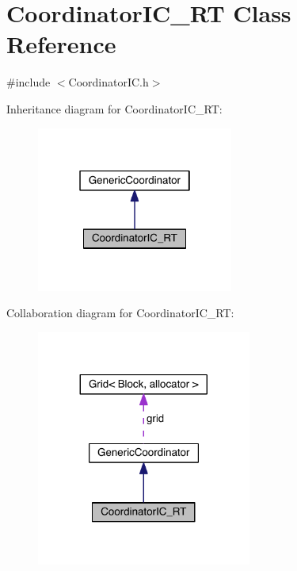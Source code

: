 \hypertarget{class_coordinator_i_c___r_t}{}\section{Coordinator\+I\+C\+\_\+\+R\+T Class Reference}
\label{class_coordinator_i_c___r_t}


{\ttfamily \#include $<$Coordinator\+I\+C.\+h$>$}



Inheritance diagram for Coordinator\+I\+C\+\_\+\+R\+T\+:\nopagebreak
\begin{figure}[H]
\begin{center}
\leavevmode
\includegraphics[width=183pt]{d2/d60/class_coordinator_i_c___r_t__inherit__graph}
\end{center}
\end{figure}


Collaboration diagram for Coordinator\+I\+C\+\_\+\+R\+T\+:\nopagebreak
\begin{figure}[H]
\begin{center}
\leavevmode
\includegraphics[width=200pt]{d9/d6d/class_coordinator_i_c___r_t__coll__graph}
\end{center}
\end{figure}
